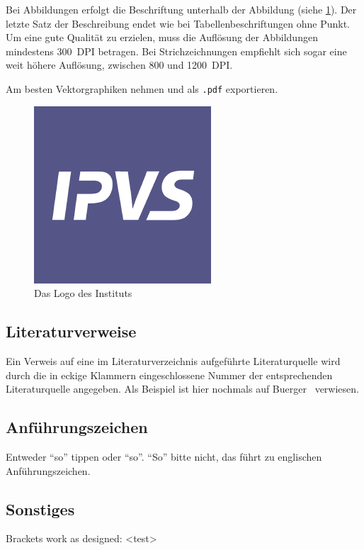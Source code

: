 \documentclass[runningheads,a4paper]{llncs}[2015/06/24]
\begin{document}
Bei Abbildungen erfolgt die Beschriftung unterhalb der Abbildung (siehe \cref{fig:logo}).
Der letzte Satz der Beschreibung endet wie bei Tabellenbeschriftungen ohne Punkt.
Um eine gute Qualität zu erzielen, muss die Auflösung der Abbildungen mindestens 300~DPI betragen.
Bei Strichzeichnungen empfiehlt sich sogar eine weit höhere Auflösung, zwischen 800 und
1200~DPI.

Am besten Vektorgraphiken nehmen und als \texttt{.pdf} exportieren.

\begin{figure}
  \begin{center}
    \includegraphics[width=.5\textwidth]{ipvslogo.png}
    \caption{Das Logo des Instituts}
    \label{fig:logo}
   \end{center}
\end{figure}

\subsection{Literaturverweise}
Ein Verweis auf eine im Literaturverzeichnis aufgeführte
Literaturquelle wird durch die in eckige Klammern eingeschlossene
Nummer der entsprechenden Literaturquelle angegeben. Als Beispiel ist
hier nochmals auf Buerger~\cite{buerger} verwiesen.

\subsection{Anführungszeichen}
Entweder "`so"' tippen oder \enquote{so}.
``So'' bitte nicht, das führt zu englischen Anführungszeichen.

\subsection{Sonstiges}
Brackets work as designed:
<test>
\end{document}
